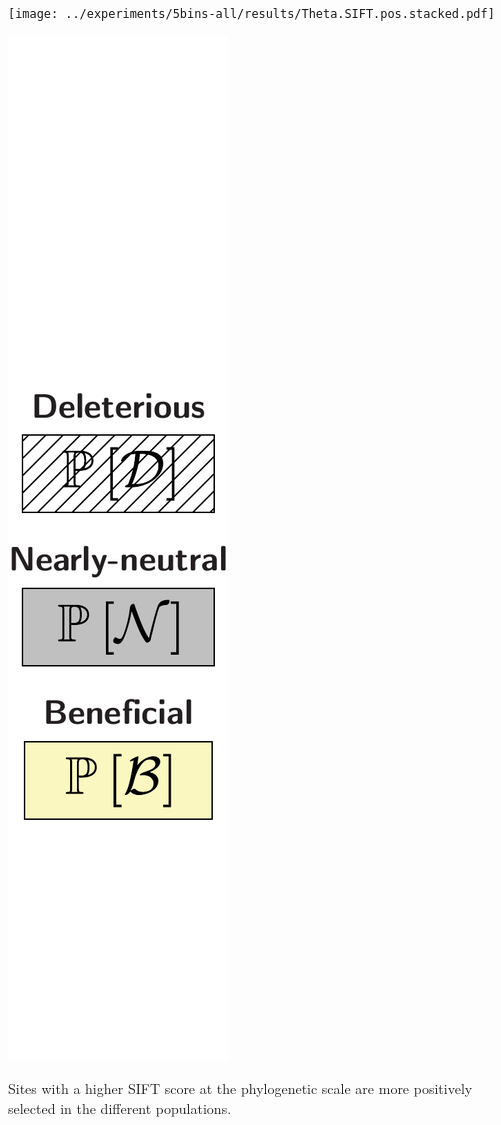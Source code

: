 \documentclass{article}
\begin{document}
\begin{center}
\begin{minipage}{0.09\linewidth}
        \end{minipage}
        \begin{minipage}{0.9\linewidth}
            \texttt{[image: ../experiments/5bins-all/results/Theta.SIFT.pos.stacked.pdf]}
        \end{minipage}
        \begin{minipage}{0.09\linewidth}
            \includegraphics[width=\linewidth, page=1]{artworks/legend.polycat}
        \end{minipage}
    \end{center}
    Sites with a higher SIFT score at the phylogenetic scale are more positively selected in the different populations.
\end{document}
